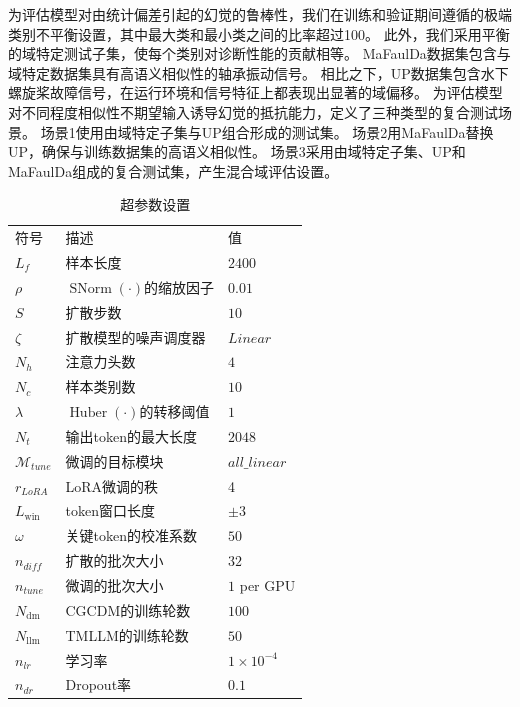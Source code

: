 \documentclass[UTF8,lettersize,journal]{IEEEtran}
\begin{document}
\setlength{\tabcolsep}{6pt}

为评估模型对由统计偏差引起的幻觉的鲁棒性，我们在训练和验证期间遵循\cite{20243817051432}的极端类别不平衡设置，其中最大类和最小类之间的比率超过100。
此外，我们采用平衡的域特定测试子集，使每个类别对诊断性能的贡献相等。 
MaFaulDa数据集包含与域特定数据集具有高语义相似性的轴承振动信号。
相比之下，UP数据集包含水下螺旋桨故障信号，在运行环境和信号特征上都表现出显著的域偏移。
为评估模型对不同程度相似性不期望输入诱导幻觉的抵抗能力，定义了三种类型的复合测试场景。
场景1使用由域特定子集与UP组合形成的测试集。
场景2用MaFaulDa替换UP，确保与训练数据集的高语义相似性。
场景3采用由域特定子集、UP和MaFaulDa组成的复合测试集，产生混合域评估设置。

\begin{table}[h!]
	\footnotesize
	\caption{超参数设置}
	\centering
	\label{tab:Hyperparameter}       %
	\begin{tabular}{lll}
		\toprule[1pt]\noalign{}
		符号&描述&值 \\
		\noalign{}\hline\noalign{\smallskip}
		$L_{f}$&样本长度& $2400$ \\
		$\rho$&$\operatorname{SNorm}(\cdot)$的缩放因子& $0.01$ \\
		$S$&扩散步数& $10$ \\
		$\zeta$ & 扩散模型的噪声调度器 & $Linear$ \\
		$N_{h}$&注意力头数& $4$ \\
		$N_{c}$&样本类别数& $10$ \\
		$\lambda$&$\operatorname{Huber}(\cdot)$的转移阈值& $1$ \\
		$N_{t}$& 输出token的最大长度 & $2048$ \\
		$\mathcal{M}_{tune}$ & 微调的目标模块 & $all\_linear$\\
		$r_{LoRA}$ & LoRA微调的秩 & 4 \\
		$L_{\mathrm{win}}$&token窗口长度& $\pm 3$ \\
		$\omega$&关键token的校准系数& $50$ \\
		$n_{diff}$&扩散的批次大小& $32$ \\
		$n_{tune}$&微调的批次大小 & $1$ per GPU\\
		${N_\mathrm{dm}}$&CGCDM的训练轮数& $100$ \\
		${N_\mathrm{llm}}$&TMLLM的训练轮数& $50$ \\
		${n_{lr}}$&学习率& $1 \times 10^{-4}$ \\
		${n_{dr}}$&Dropout率& $0.1$ \\
		\bottomrule[1pt]
	\end{tabular}
\end{table}
\end{document}
